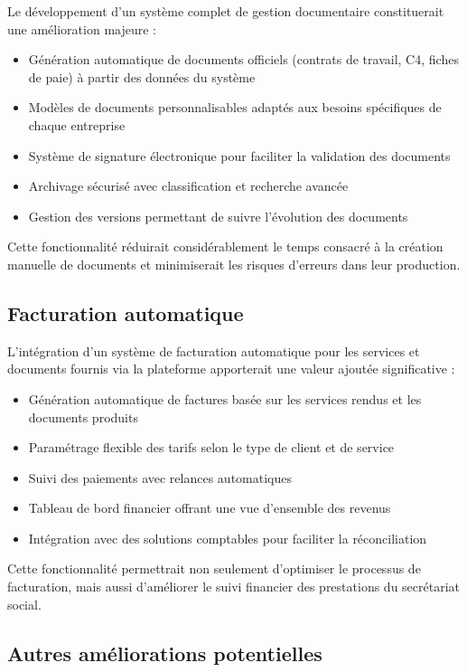 \documentclass[12pt,a4paper]{report}
\begin{document}
Le développement d'un système complet de gestion documentaire constituerait une amélioration majeure :

\begin{itemize}
  \item Génération automatique de documents officiels (contrats de travail, C4, fiches de paie) à partir des données du système
  \item Modèles de documents personnalisables adaptés aux besoins spécifiques de chaque entreprise
  \item Système de signature électronique pour faciliter la validation des documents
  \item Archivage sécurisé avec classification et recherche avancée
  \item Gestion des versions permettant de suivre l'évolution des documents
\end{itemize}

Cette fonctionnalité réduirait considérablement le temps consacré à la création manuelle de documents et minimiserait les risques d'erreurs dans leur production.

\subsection{Facturation automatique}

L'intégration d'un système de facturation automatique pour les services et documents fournis via la plateforme apporterait une valeur ajoutée significative :

\begin{itemize}
  \item Génération automatique de factures basée sur les services rendus et les documents produits
  \item Paramétrage flexible des tarifs selon le type de client et de service
  \item Suivi des paiements avec relances automatiques
  \item Tableau de bord financier offrant une vue d'ensemble des revenus
  \item Intégration avec des solutions comptables pour faciliter la réconciliation
\end{itemize}

Cette fonctionnalité permettrait non seulement d'optimiser le processus de facturation, mais aussi d'améliorer le suivi financier des prestations du secrétariat social.

\subsection{Autres améliorations potentielles}
\end{document}
